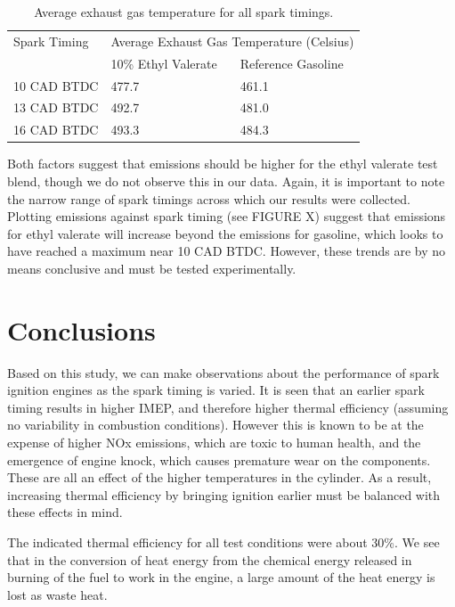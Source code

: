 \documentclass[11pt]{article}
\begin{document}
\begin{table}[H]
	\begin{center}
	\begin{tabular}{@{}lll@{}}
		\toprule
		Spark Timing & \multicolumn{2}{c}{Average Exhaust Gas Temperature (Celsius)} \\
		\cmidrule{2-3} & 10\% Ethyl Valerate & Reference Gasoline \\
		\midrule
		10 CAD BTDC & 477.7 & 461.1 \\
		13 CAD BTDC & 492.7 & 481.0 \\
		16 CAD BTDC & 493.3 & 484.3 \\
		\bottomrule
	\end{tabular}
	\caption{Average exhaust gas temperature for all spark timings.}
	\label{q7-t1}
	\end{center}
\end{table}
Both factors suggest that  emissions should be higher for the ethyl valerate test blend, though we do not observe this in our data. Again, it is important to note the narrow range of spark timings across which our results were collected. Plotting  emissions against spark timing (see FIGURE X) suggest that  emissions for ethyl valerate will increase beyond the  emissions for gasoline, which looks to have reached a maximum near 10 CAD BTDC. However, these trends are by no means conclusive and must be tested experimentally.
\section{Conclusions}
Based on this study, we can make observations about the performance of spark ignition engines as the spark timing is varied. It is seen that an earlier spark timing results in higher IMEP, and therefore higher thermal efficiency (assuming no variability in combustion conditions). However this is known to be at the expense of higher NOx emissions, which are toxic to human health, and the emergence of engine knock, which causes premature wear on the components. These are all an effect of the higher temperatures in the cylinder. As a result, increasing thermal efficiency by bringing ignition earlier must be balanced with these effects in mind. 

The indicated thermal efficiency for all test conditions were about 30\%. We see that in the conversion of heat energy from the chemical energy released in burning of the fuel to work in the engine, a large amount of the heat energy is lost as waste heat.
\end{document}
